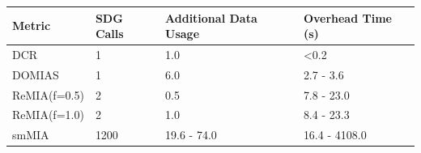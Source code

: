 \begin{tabular}{llll}
    \toprule
    Metric & SDG Calls & Additional Data Usage & Overhead Time (s) \\
    \midrule
    DCR & 1 & 1.0 & <0.2 \\
    DOMIAS & 1 & 6.0 & 2.7 - 3.6 \\
    ReMIA(f=0.5) & 2 & 0.5 & 7.8 - 23.0 \\
    ReMIA(f=1.0) & 2 & 1.0 & 8.4 - 23.3 \\
    smMIA & 1200 & 19.6 - 74.0 & 16.4 - 4108.0 \\
    \bottomrule
\end{tabular}
